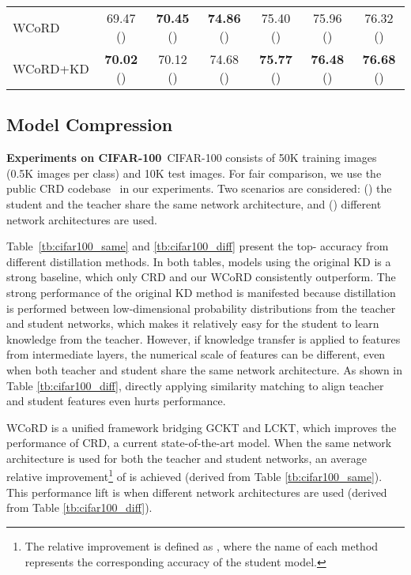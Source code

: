 \documentclass[final]{cvpr}
\theoremstyle{definition}
\begin{document}
\begin{table*}[t!]
\begin{center}
\begin{tabular}{lcccccc}
WCoRD & 69.47 ()& \textbf{70.45} ()& \textbf{74.86} ()& 75.40 ()& 75.96 ()& 76.32 ()\\
                                                      
WCoRD+KD & \textbf{70.02} ()& {70.12} ()& {74.68} ()& \textbf{75.77} ()& \textbf{76.48} ()& \textbf{76.68} ()\\
\bottomrule
\end{tabular}
\caption{
\small{
CIFAR-100 test \emph{accuracy} (\%) of a student network trained with a number of distillation methods, when the teacher network architecture is significantly different. We use the same codebase from the CRD repository. Our reported results are averaged over 5 runs. Note that  is the same as the weight on CRD, and .
}}
\label{tb:cifar100_diff}
\end{center}
\vspace{-4mm}
\end{table*} 
\subsection{Model Compression}

\noindent\textbf{Experiments on CIFAR-100}\,
CIFAR-100 \cite{krizhevsky2009learning} consists of 50K training images (0.5K images per class) and 10K test images.
For fair comparison, we use the public CRD codebase~\cite{tian2019contrastive} in our experiments. 
Two scenarios are considered: () the student and the teacher share the same network architecture, and () different network architectures are used. 


Table~\ref{tb:cifar100_same} and \ref{tb:cifar100_diff} present the top- accuracy from different distillation methods.
In both tables, models using the original KD is a strong baseline, which only CRD and our WCoRD consistently outperform. 
The strong performance of the original KD method is manifested because distillation is performed between low-dimensional probability distributions from the teacher and student networks,
which makes it relatively easy for the student to learn knowledge from the teacher.
However, if knowledge transfer is applied to features from intermediate layers, the numerical scale of features can be different, even when both teacher and student share the same network architecture. As shown in Table \ref{tb:cifar100_diff}, directly applying similarity matching to align teacher and student features even hurts performance. 


WCoRD is a unified framework bridging GCKT and LCKT, which improves the performance of CRD, a current state-of-the-art model. 
When the same network architecture is used for both the teacher and student networks, an average relative improvement\footnote{The relative improvement is defined as , where the name of each method represents the corresponding accuracy of the student model.} of  is achieved (derived from Table \ref{tb:cifar100_same}). This performance lift is  when different network architectures are used (derived from Table \ref{tb:cifar100_diff}).
\end{document}
